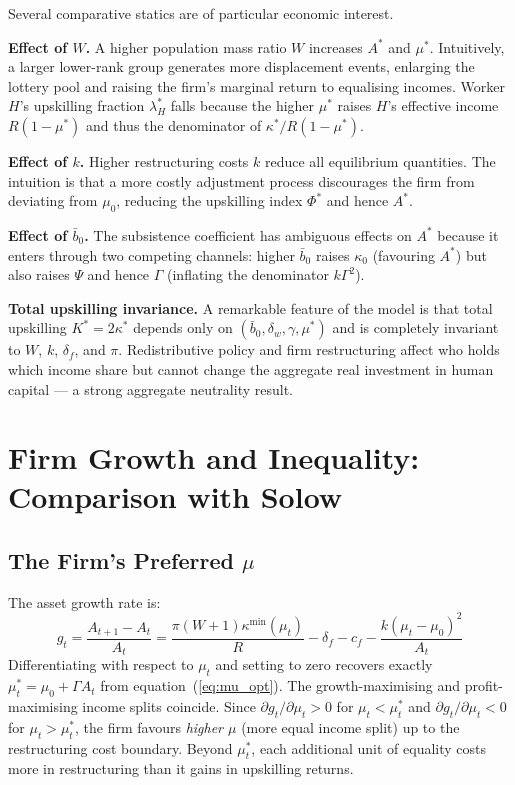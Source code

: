 \documentclass[12pt,a4paper]{article}
\begin{document}
Several comparative statics are of particular economic interest.

\textbf{Effect of $W$.}
A higher population mass ratio $W$ increases $A^*$ and $\mu^*$.
Intuitively, a larger lower-rank group generates more displacement
events, enlarging the lottery pool and raising the firm's marginal
return to equalising incomes. Worker $H$'s upskilling fraction $\lambda_H^*$
falls because the higher $\mu^*$ raises $H$'s effective income
$R(1-\mu^*)$ and thus the denominator of $\kappa^*/R(1-\mu^*)$.

\textbf{Effect of $k$.}
Higher restructuring costs $k$ reduce all equilibrium quantities.
The intuition is that a more costly adjustment process discourages
the firm from deviating from $\mu_0$, reducing the upskilling index
$\Phi^*$ and hence $A^*$.

\textbf{Effect of $\bar{b}_0$.}
The subsistence coefficient has ambiguous effects on $A^*$ because
it enters through two competing channels: higher $\bar{b}_0$ raises
$\kappa_0$ (favouring $A^*$) but also raises $\Psi$ and hence $\Gamma$
(inflating the denominator $k\Gamma^2$).

\textbf{Total upskilling invariance.}
A remarkable feature of the model is that total upskilling
$K^* = 2\kappa^*$ depends only on $(\bar{b}_0, \delta_w, \gamma, \mu^*)$
and is completely invariant to $W$, $k$, $\delta_f$, and $\pi$.
Redistributive policy and firm restructuring affect who holds which
income share but cannot change the aggregate real investment in
human capital — a strong aggregate neutrality result.

\section{Firm Growth and Inequality: Comparison with Solow}

\subsection{The Firm's Preferred $\mu$}

The asset growth rate is:
\begin{equation}
  g_t = \frac{A_{t+1}-A_t}{A_t}
  = \frac{\pi(W+1)\kappa^{\min}(\mu_t)}{R} - \delta_f - c_f
    - \frac{k(\mu_t-\mu_0)^2}{A_t}
  \label{eq:growth_rate}
\end{equation}
Differentiating with respect to $\mu_t$ and setting to zero recovers
exactly $\mu_t^* = \mu_0 + \Gamma A_t$ from equation~(\ref{eq:mu_opt}).
The growth-maximising and profit-maximising income splits coincide.
Since $\partial g_t/\partial\mu_t > 0$ for $\mu_t < \mu_t^*$
and $\partial g_t/\partial\mu_t < 0$ for $\mu_t > \mu_t^*$,
the firm favours \emph{higher $\mu$} (more equal income split)
up to the restructuring cost boundary. Beyond $\mu_t^*$,
each additional unit of equality costs more in restructuring
than it gains in upskilling returns.
\end{document}
